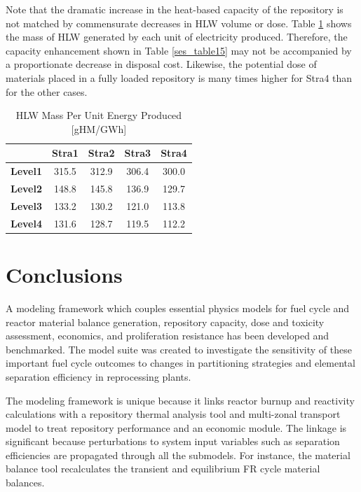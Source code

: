 Note that the dramatic increase in the heat-based capacity of the
repository is not matched by commensurate decreases in HLW volume or
dose.  Table \ref{ses_table17} shows the mass of HLW generated by each unit of
electricity produced. Therefore, the capacity
enhancement shown in Table \ref{ses_table15} may not be accompanied by a proportionate
decrease in disposal cost. Likewise, the potential dose of materials
placed in a fully loaded repository is many times higher for Stra4 than
for the other cases.  

\begin{table}[htbp]
\begin{center}
\caption{HLW Mass Per Unit Energy Produced [gHM/GWh]}
\label{ses_table17}
\begin{tabular}{|l|c|c|c|c|}
\hline
                & \textbf{Stra1} & \textbf{Stra2} & \textbf{Stra3} & \textbf{Stra4} \\
\hline
\textbf{Level1} & 315.5          & 312.9          & 306.4          & 300.0 \\
\textbf{Level2} & 148.8          & 145.8          & 136.9          & 129.7 \\
\textbf{Level3} & 133.2          & 130.2          & 121.0          & 113.8 \\
\textbf{Level4} & 131.6          & 128.7          & 119.5          & 112.2 \\
\hline
\end{tabular}
\end{center}
\end{table}




\section{Conclusions}
\label{ses_sec:conclusions}
A modeling framework which couples essential physics models for fuel
cycle and reactor material balance generation, repository capacity, dose
and toxicity assessment, economics, and proliferation resistance has been 
developed and benchmarked.  The
model suite was created to investigate the sensitivity of these
important fuel cycle outcomes to changes in partitioning strategies and
elemental separation efficiency in reprocessing plants.

The modeling framework is unique because it links reactor burnup and reactivity
calculations with a repository thermal analysis tool and
multi-zonal transport model to treat repository performance and an
economic module.  The linkage is significant because perturbations to
system input variables such as separation efficiencies are propagated
through all the submodels.  For instance, the material balance tool
recalculates the transient and equilibrium FR cycle material balances.

